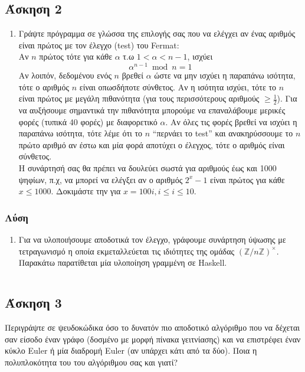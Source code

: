 \documentclass[12pt]{report}
\newcommand{\en}[1]{\textlatin{#1}}
\begin{document}
\newpage\subsection*{Άσκηση 2}
\begin{enumerate}
\item
Γράψτε πρόγραμμα σε γλώσσα της επιλογής σας που να ελέγχει αν ένας αριθμός
είναι πρώτος με τον έλεγχο (\en{test}) του \en{Fermat}:\\
Αν $n$ πρώτος τότε για κάθε $\alpha$ τ.ω $1 < \alpha < n -1$, ισχύει
\begin{equation*} \alpha^{n-1} \bmod n = 1 \end{equation*}
Αν λοιπόν, δεδομένου ενός $n$ βρεθεί $\alpha$ ώστε να μην ισχύει η παραπάνω
ισότητα, τότε ο αριθμός $n$ είναι οπωσδήποτε σύνθετος. Αν η ισότητα ισχύει,
τότε το $n$ είναι πρώτος με μεγάλη πιθανότητα (για τους περισσότερους αριθμούς
$\ge \frac{1}{2}$). Για να αυξήσουμε σημαντικά την πιθανότητα μπορούμε να 
επαναλάβουμε μερικές φορές (τυπικά 40 φορές) με διαφορετικό $\alpha$. Αν όλες
τις φορές βρεθεί να ισχύει η παραπάνω ισότητα, τότε λέμε ότι το $n$ 
``περνάει το \en{test}'' και ανακηρύσσουμε το $n$ πρώτο αριθμό αν
έστω και μία φορά αποτύχει ο έλεγχος, τότε ο αριθμός είναι σύνθετος.\\
Η συνάρτησή σας θα πρέπει να δουλεύει σωστά για αριθμούς έως και 1000 ψηφίων,
π.χ, να μπορεί να ελέγξει αν ο αριθμός $2^x-1$ είναι πρώτος για κάθε 
$x \le 1000$. Δοκιμάστε την για $x=100i, i \le i \le 10$. 
\end{enumerate}

\subsubsection*{Λύση}

\begin{enumerate}
\item
Για να υλοποιήσουμε αποδοτικά τον έλεγχο, γράφουμε συνάρτηση
ύψωσης με τετραγωνισμό η οποία εκμεταλλεύεται τις ιδιότητες της
ομάδας $(\mathbb{Z}/n\mathbb{Z})^{\times}$. Παρακάτω παρατίθεται 
μία υλοποίηση γραμμένη σε \en{Haskell}.


\inputminted{haskell}{HaskellTemp.hs}



\end{enumerate}

\newpage\subsection*{Άσκηση 3}
Περιγράψτε σε ψευδοκώδικα όσο το δυνατόν πιο αποδοτικό αλγόριθμο που να δέχεται
σαν είσοδο έναν γράφο (δοσμένο με μορφή πίνακα γειτνίασης) και να επιστρέφει 
έναν κύκλο \en{Euler} ή μία διαδρομή \en{Euler} (αν υπάρχει κάτι από τα δύο).
Ποια η πολυπλοκότητα του του αλγόριθμου σας και γιατί?
\end{document}
